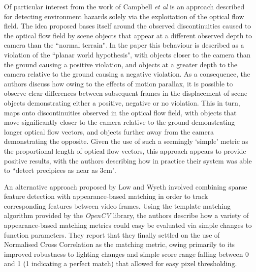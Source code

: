 Of particular interest from the work of Campbell \textit{et al} \cite{campbell} is an approach described for detecting environment hazards solely via the exploitation of the optical flow field. The idea proposed bases itself around the observed discontinuities caused to the optical flow field by scene objects that appear at a different observed depth to camera than the ``normal terrain". In the paper this behaviour is described as a violation of the ``planar world hypothesis", with objects closer to the camera than the ground causing a positive violation, and objects at a greater depth to the camera relative to the ground causing a negative violation. As a consequence, the authors discuss how owing to the effects of motion parallax, it is possible to observe clear differences between subsequent frames in the displacement of scene objects demonstrating either a positive, negative or no violation. This in turn, maps onto discontinuities observed in the optical flow field, with objects that move significantly closer to the camera relative to the ground demonstrating longer optical flow vectors, and objects further away from the camera demonstrating the opposite. Given the use of such a seemingly `simple' metric as the proportional length of optical flow vectors, this approach appears to provide positive results, with the authors describing how in practice their system was able to ``detect precipices as near as 3cm". 

An alternative approach proposed by Low and Wyeth \cite{low-wyeth} involved combining sparse feature detection with appearance-based matching in order to track corresponding features between video frames. Using the template matching algorithm provided by the \textit{OpenCV} library, the authors describe how a variety of appearance-based matching metrics could easy be evaluated via simple changes to function parameters. They report that they finally settled on the use of Normalised Cross Correlation as the matching metric, owing primarily to its improved robustness to lighting changes and simple score range falling between 0 and 1 (1 indicating a perfect match) that allowed for easy pixel thresholding.


